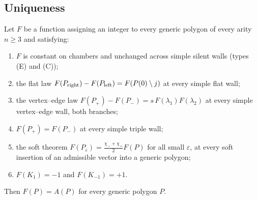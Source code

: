 \subsection{Uniqueness}

\begin{theorem}\label{thm:uniqueness}
Let $F$ be a function assigning an integer to every generic polygon of every
arity $n\geq3$ and satisfying:
\begin{enumerate}
\item[(a)] $F$ is constant on chambers and unchanged across simple silent
walls (types (E) and (C));
\item[(b)] the flat law $F(P_{\rm right})-F(P_{\rm left})=F(P(0)\setminus j)$
at every simple flat wall;
\item[(c)] the vertex--edge law $F(P_+)-F(P_-)=s\,F(\lambda_1)F(\lambda_2)$
at every simple vertex--edge wall, both branches;
\item[(d)] $F(P_+)=F(P_-)$ at every simple triple wall;
\item[(e)] the soft theorem $F(P_\varepsilon)=\frac{\chi_-+\chi_+}2F(P)$ for
all small $\varepsilon$, at every soft insertion of an admissible vector into
a generic polygon;
\item[(f)] $F(K_1)=-1$ and $F(K_{-1})=+1$.
\end{enumerate}
Then $F(P)=A(P)$ for every generic polygon $P$. 
\end{theorem}
